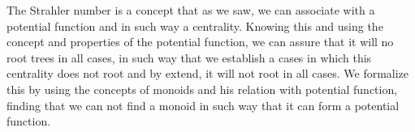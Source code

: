 
The Strahler number is a concept that as we saw, we can associate with a potential function and in such way a centrality. Knowing this and using the concept and properties of the potential function, we can assure that it will no root trees in all cases, in such way that we establish a cases in which this centrality does not root and by extend, it will not root in all cases. We formalize this by using the concepts of monoids and his relation with potential function, finding that we can not find a monoid in such way that it can form a potential function.